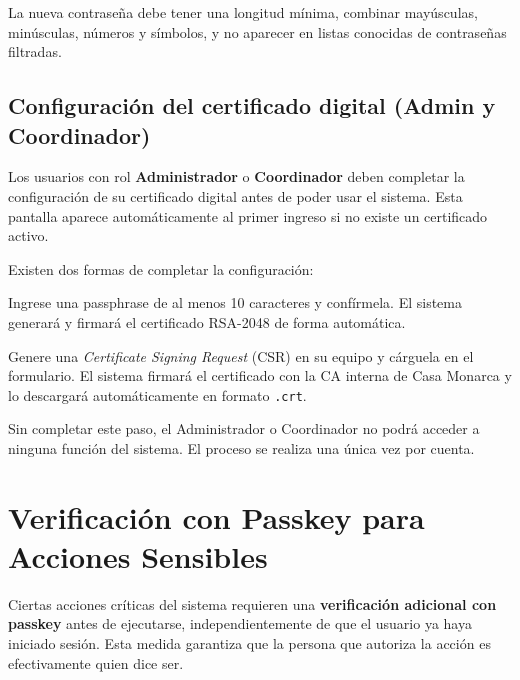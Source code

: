 \documentclass[11pt,twoside]{article}
\begin{document}
\begin{nota}
La nueva contraseña debe tener una longitud mínima, combinar mayúsculas,
minúsculas, números y símbolos, y no aparecer en listas conocidas de
contraseñas filtradas.
\end{nota}

\subsection{Configuración del certificado digital (Admin y Coordinador)}
\label{sec:cert-setup}

Los usuarios con rol \textbf{Administrador} o \textbf{Coordinador} deben
completar la configuración de su certificado digital antes de poder usar el
sistema. Esta pantalla aparece automáticamente al primer ingreso si no existe
un certificado activo.

Existen dos formas de completar la configuración:

\begin{description}[leftmargin=2em]
  \item[Opción A — Passphrase automática]
    Ingrese una passphrase de al menos 10 caracteres y confírmela. El sistema
    generará y firmará el certificado RSA-2048 de forma automática.
  \item[Opción B — CSR propio]
    Genere una \textit{Certificate Signing Request} (CSR) en su equipo y
    cárguela en el formulario. El sistema firmará el certificado con la CA
    interna de Casa Monarca y lo descargará automáticamente en formato
    \texttt{.crt}.
\end{description}

\begin{nota}
Sin completar este paso, el Administrador o Coordinador no podrá acceder a
ninguna función del sistema. El proceso se realiza una única vez por cuenta.
\end{nota}

\section{Verificación con Passkey para Acciones Sensibles}
\label{sec:passkey-action}

Ciertas acciones críticas del sistema requieren una \textbf{verificación
adicional con passkey} antes de ejecutarse, independientemente de que el
usuario ya haya iniciado sesión. Esta medida garantiza que la persona que
autoriza la acción es efectivamente quien dice ser.
\end{document}
